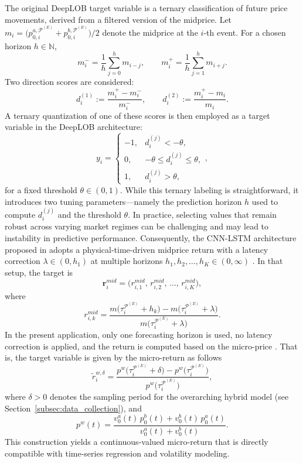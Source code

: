 \documentclass{rQUF2e}
\theoremstyle{plain}
\theoremstyle{definition}
\theoremstyle{remark}
\begin{document}
The original DeepLOB target variable is a ternary classification of future price movements, derived from a filtered version of the midprice. Let $m_i = \bigl(p^{a, \mathcal{P}^{(E)}}_{0,i} + p^{b, \mathcal{P}^{(E)}}_{0,i}\bigr) / 2$ denote the midprice at the $i$-th event. For a chosen horizon $h \in \mathbb{N}$,
\[
    m_i^- = \frac{1}{h}\sum_{j=0}^{h} m_{i-j},
    \quad\quad
    m_i^+ = \frac{1}{h}\sum_{j=1}^{h} m_{i+j}.
\]
Two direction scores are considered:
\[
    d_i^{(1)} := \frac{m_i^+ - m_i^-}{m_i^-},
    \quad\quad
    d_i^{(2)} := \frac{m_i^+ - m_i}{m_i}.
\]
A ternary quantization of one of these scores is then employed as a target variable in the DeepLOB architecture:
\[
    y_i =
    \begin{cases}
        -1, & d_i^{(j)} < -\theta,              \\[6pt]
        0,  & -\theta \le d_i^{(j)} \le \theta, \\[6pt]
        1,  & d_i^{(j)} > \theta,
    \end{cases},
\]
for a fixed threshold \(\theta \in (0, 1)\). While this ternary labeling is straightforward, it introduces two tuning parameters—namely the prediction horizon \(h\) used to compute \(d_i^{(j)}\) and the threshold \(\theta\). In practice, selecting values that remain robust across varying market regimes can be challenging and may lead to instability in predictive performance. Consequently, the CNN-LSTM architecture proposed in \citep{kolm2023deep} adopts a physical-time-driven midprice return with a latency correction \(\lambda \in (0, h_1)\) at multiple horizons \(h_1, h_2, \dots, h_K \in (0, \infty)\) . In that setup, the target is
\[
    \mathbf{r}^{mid}_i
    =
    \bigl(r^{mid}_{i, 1},\, r^{mid}_{i, 2},\, \dots,\, r^{mid}_{i, K}\bigr),
\]
where
\[
    r^{mid}_{i, k}
    =
    \frac{m\bigl(\tau^{\mathcal{P}^{(E)}}_i + h_k\bigr)
        - m\bigl(\tau^{\mathcal{P}^{(E)}}_i + \lambda\bigr)}
    {m\bigl(\tau^{\mathcal{P}^{(E)}}_i + \lambda\bigr)}.
\]
In the present application, only one forecasting horizon is used, no latency correction is applied, and the return is computed based on the micro-price \citep{gatheral2010zero}. That is, the target variable is given by the micro-return as follows
\begin{equation}
    \tilde{r}^{w, \delta}_{i}
    =
    \frac{p^w\bigl(\tau^{\mathcal{P}^{(E)}}_i + \delta\bigr) - p^w\bigl(\tau^{\mathcal{P}^{(E)}}_i\bigr)}
    {p^w\bigl(\tau^{\mathcal{P}^{(E)}}_i\bigr)},
    \label{eq:micro_ret_cnnlstm}
\end{equation}
where $\delta > 0$ denotes the sampling period for the overarching hybrid model (see Section~\ref{subsec:data_collection}), and
\[
    p^w(t)
    =
    \frac{v^a_0(t)\,p^b_0(t) + v^b_0(t)\,p^a_0(t)}
    {v^a_0(t) + v^b_0(t)}.
\]
This construction yields a continuous-valued micro-return that is directly compatible with time-series regression and volatility modeling.
\end{document}

